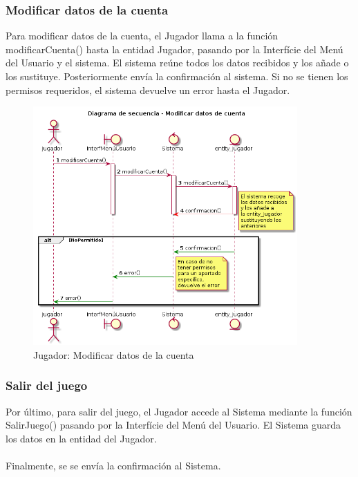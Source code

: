   
\newpage
\subsubsection{Modificar datos de la cuenta}
  Para modificar datos de la cuenta, el Jugador llama a la función modificarCuenta() hasta la entidad Jugador, pasando por la Interfície del Menú del Usuario y el sistema. El sistema reúne todos los datos recibidos y los añade o los sustituye. Posteriormente envía la confirmación al sistema. Si no se tienen los permisos requeridos, el sistema devuelve un error hasta el Jugador.
  
  
\begin{figure}[ht]
 \centering
 	  \includegraphics[width=0.9\textwidth]{./imatges/jugador/Modificar_datos_de_cuenta.png}
 \caption{Jugador: Modificar datos de la cuenta}
 \end{figure}
  
  
\newpage
\subsubsection{Salir del juego}
  Por último, para salir del juego, el Jugador accede al Sistema mediante la función SalirJuego() pasando por la Interfície del Menú del Usuario. El Sistema guarda los datos en la entidad del Jugador.\\
  \\ Finalmente, se se envía la confirmación al Sistema.
  
